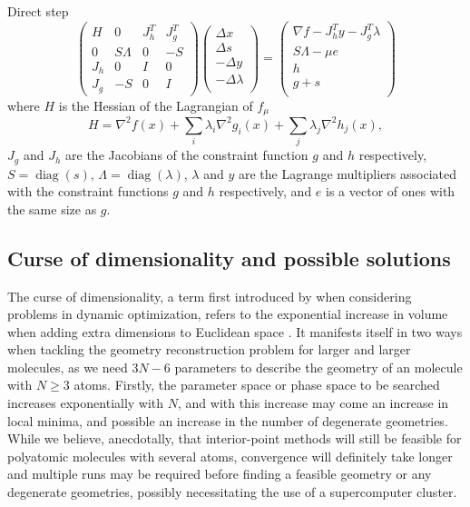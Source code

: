 Direct step
\begin{equation}
\begin{pmatrix}
  H   & 0        & J_h^T & J_g^T \\
  0   & S\Lambda & 0     & -S \\
  J_h & 0        & I     & 0 \\
  J_g & -S       & 0     & I
\end{pmatrix}
\begin{pmatrix}
  \Delta x  \\
  \Delta s  \\
  -\Delta y \\
  -\Delta \lambda \\
\end{pmatrix}
=
\begin{pmatrix}
\nabla f - J_h^T y - J_g^T \lambda  \\
S\Lambda - \mu e \\
h \\
g + s \\
\end{pmatrix}
\end{equation}
where $H$ is the Hessian of the Lagrangian of $f_\mu$
\begin{equation}
H = \nabla^2 f(x) + \sum_i \lambda_i \nabla^2 g_i(x) + \sum_j \lambda_j \nabla^2 h_j(x),
\end{equation}
$J_g$ and $J_h$ are the Jacobians of the constraint function $g$ and $h$ respectively, $S = \operatorname{diag}(s)$, $\Lambda = \operatorname{diag}(\lambda)$, $\lambda$ and $y$ are the Lagrange multipliers associated with the constraint functions $g$ and $h$ respectively, and $e$ is a vector of ones with the same size as $g$.


\subsection{Curse of dimensionality and possible solutions}
The curse of dimensionality, a term first introduced by \citet{Bellman57} when considering problems in dynamic optimization, refers to the exponential increase in volume when adding extra dimensions to Euclidean space \citep{Keogh10}. It manifests itself in two ways when tackling the geometry reconstruction problem for larger and larger molecules, as we need $3N-6$ parameters to describe the geometry of an molecule with $N \ge 3$ atoms. Firstly, the parameter space or phase space to be searched increases exponentially with $N$, and with this increase may come an increase in local minima, and possible an increase in the number of degenerate geometries. While we believe, anecdotally, that interior-point methods will still be feasible for polyatomic molecules with several atoms, convergence will definitely take longer and multiple runs may be required before finding a feasible geometry or any degenerate geometries, possibly necessitating the use of a supercomputer cluster.

